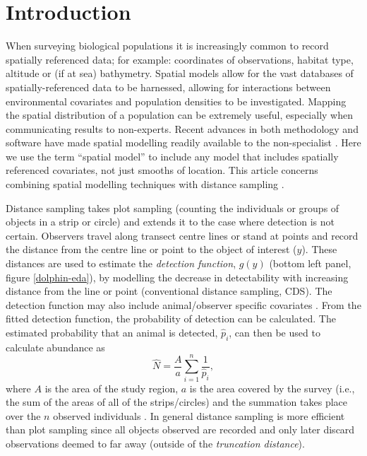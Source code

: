 \documentclass[a4paper,12pt]{article}
\begin{document}
\newpage

\section*{Introduction}
\label{s:intro}

When surveying biological populations it is increasingly common to record spatially referenced data; for example: coordinates of observations, habitat type, altitude or (if at sea) bathymetry. Spatial models allow for the vast databases of spatially-referenced data to be harnessed, allowing for interactions between environmental covariates and population densities to be investigated. Mapping the spatial distribution of a population can be extremely useful, especially when communicating results to non-experts. Recent advances in both methodology and software have made spatial modelling readily available to the non-specialist \citep[e.g.,][]{Wood:2006wz, Rue:2009tw}. Here we use the term ``spatial model'' to include any model that includes spatially referenced covariates, not just smooths of location. This article concerns combining spatial modelling techniques with distance sampling \citep{Buckland:2001vm, Buckland:2004ts}. 

Distance sampling takes plot sampling (counting the individuals or groups of objects in a strip or circle) and extends it to the case where detection is not certain. Observers travel along transect centre lines or stand at points and record the distance from the centre line or point to the object of interest ($y$). These distances are used to estimate the \textit{detection function}, $g(y)$ (bottom left panel, figure \ref{dolphin-eda}), by modelling the decrease in detectability with increasing distance from the line or point (conventional distance sampling, CDS). The detection function may also include animal/observer specific covariates \citep[multiple covariate distance sampling, MCDS;][]{Marques:2007vm}. From the fitted detection function, the probability of detection can be calculated. The estimated probability that an animal is detected, $\hat{p}_i$, can then be used to calculate abundance as
\begin{equation}
\hat{N} = \frac{A}{a} \sum_{i=1}^{n} \frac{1}{\hat{p}_i},
\label{ht-est}
\end{equation}
where $A$ is the area of the study region, $a$ is the area covered by the survey (i.e., the sum of the areas of all of the strips/circles) and the summation takes place over the $n$ observed individuals \citep[Chapter 3]{Buckland:2001vm}. In general distance sampling is more efficient than plot sampling since all objects observed are recorded and only later discard observations deemed to far away (outside of the \textit{truncation distance}).
\end{document}
